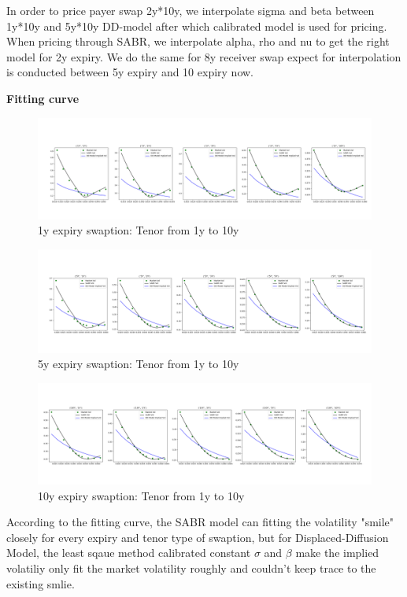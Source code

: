 \documentclass{article}
\begin{document}
\noindent In order to price payer swap 2y*10y, we interpolate sigma and beta between 1y*10y and 5y*10y DD-model after which calibrated model is used for pricing. When pricing through SABR, we interpolate alpha, rho and nu to get the right model for 2y expiry. We do the same for 8y receiver swap expect for interpolation is conducted between 5y expiry and 10 expiry now.

\newpage
\noindent \textbf{Fitting curve}\\
\begin{figure}[h]
	\flushleft
	\includegraphics[width=1\linewidth]{./images/1Y.png}
	\caption{1y expiry swaption: Tenor from 1y to 10y}
	\label{fig:sub1}
\end{figure}
\begin{figure}[h]
	\flushleft
	\includegraphics[width=1\linewidth]{./images/5Y.png}
	\caption{5y expiry swaption: Tenor from 1y to 10y}
	\label{fig:sub1}
\end{figure}
\begin{figure}[h]
	\flushleft
	\includegraphics[width=1\linewidth]{./images/10Y.png}
	\caption{10y expiry swaption: Tenor from 1y to 10y}
	\label{fig:sub1}
\end{figure}


\noindent According to the fitting curve, the SABR model can fitting the volatility "smile" closely for every expiry and tenor type of swaption, but for Displaced-Diffusion Model, the least sqaue method calibrated constant $\sigma$ and $\beta$ make the implied volatiliy only fit the market volatility roughly and couldn't keep trace to the existing smlie. \\ 
\end{document}

